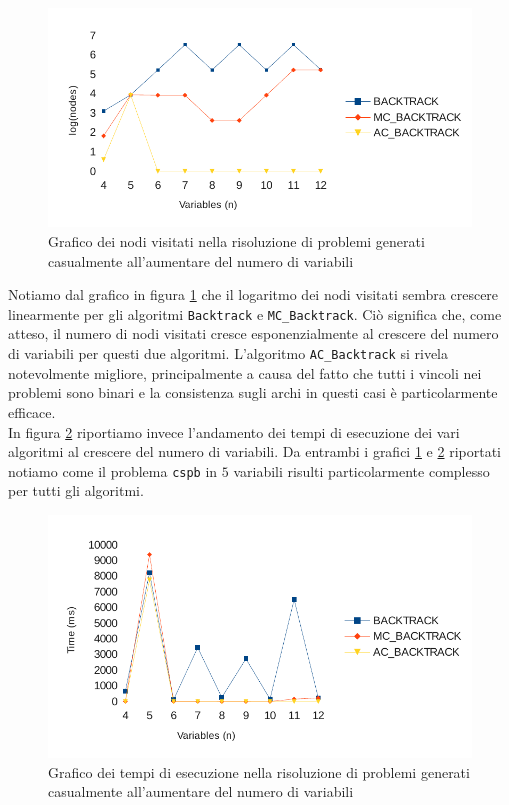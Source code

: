 \documentclass[10pt, a4paper]{article}
\begin{document}
\begin{figure}[!h]
\begin{center}
\includegraphics[scale=0.8]{./report-images/test2_nodes.pdf}
\caption{Grafico dei nodi visitati nella risoluzione di problemi generati casualmente all'aumentare del numero di variabili}
\label{fig:test2_nodes}
\end{center}
\end{figure}

Notiamo dal grafico in figura \ref{fig:test2_nodes} che il logaritmo dei nodi visitati sembra crescere linearmente per gli algoritmi \texttt{Backtrack} e \texttt{MC\_Backtrack}. Ciò significa che, come atteso, il numero di nodi visitati cresce esponenzialmente al crescere del numero di variabili per questi due algoritmi. L'algoritmo \texttt{AC\_Backtrack} si rivela notevolmente migliore, principalmente a causa del fatto che tutti i vincoli nei problemi sono binari e la consistenza sugli archi in questi casi è particolarmente efficace.\\
In figura \ref{fig:test2_time} riportiamo invece l'andamento dei tempi di esecuzione dei vari algoritmi al crescere del numero di variabili. Da entrambi i grafici \ref{fig:test2_nodes} e \ref{fig:test2_time} riportati notiamo come il problema \texttt{cspb} in $5$ variabili risulti particolarmente complesso per tutti gli algoritmi.

\begin{figure}[!h]
\begin{center}
\includegraphics[scale=0.9]{./report-images/test2_time.pdf}
\caption{Grafico dei tempi di esecuzione nella risoluzione di problemi generati casualmente all'aumentare del numero di variabili}
\label{fig:test2_time}
\end{center}
\end{figure}
\end{document}
